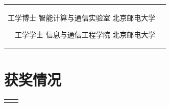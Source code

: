 \documentclass[10pt]{article} %
\begin{document}
\begin{paracol}{2}
\begin{supertabular}{rl}
		
		{工学博士} %
		{} %
		{智能计算与通信实验室} %
		{北京邮电大学} %
		
		
		{工学学士} %
		{} %
		{信息与通信工程学院} %
		{北京邮电大学} %
		
		
	\end{supertabular}
	
	
	\section{获奖情况}
	
	
	
	
	
	\begin{supertabular}{rl} %
		
		
		
		
		
		

\end{supertabular}
\end{paracol}
\end{document}
